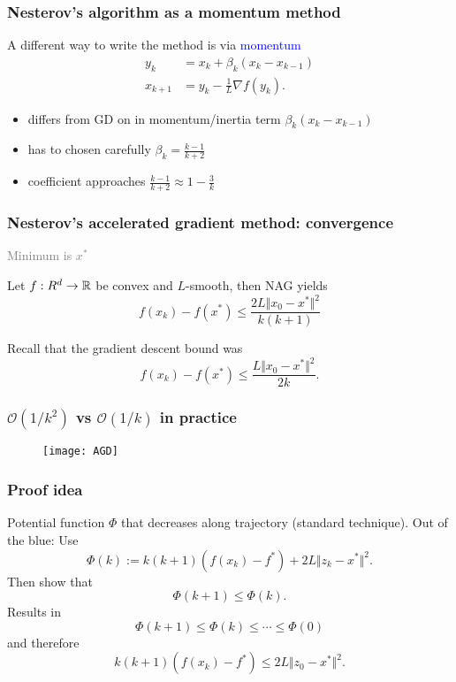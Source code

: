 \documentclass[aspectratio=149]{beamer}
\begin{document}
\begin{frame}
  \frametitle{Nesterov's algorithm as a momentum method}
  A different way to write the method is via \textcolor{blue}{momentum}
  \begin{align}
    y_{k} &= x_k + \beta_k (x_k - x_{k-1}) \\
    x_{k+1} &= y_k - \frac{1}{L} \nabla f(y_k).
  \end{align}

  \begin{itemize}
    \item differs from GD on in momentum/inertia term $\beta_k (x_k - x_{k-1})$
    \item has to chosen carefully $\beta_k = \frac{k-1}{k+2}$
    \item coefficient approaches $\frac{k-1}{k+2} \approx 1 - \frac{3}{k}$
  \end{itemize}
\end{frame}


\begin{frame}
  \frametitle{Nesterov's accelerated gradient method: convergence}
  \textcolor{grey}{Minimum is $x^*$ }
  \begin{theorem}
    Let $f: R^d \to \mathbb{R}$ be convex and $L$-smooth, then NAG yields
    \begin{equation}
      f(x_k) - f(x^*) \le \frac{2L \Vert x_0-x^* \Vert^2}{k(k+1)}
    \end{equation}
  \end{theorem}

  Recall that the gradient descent bound was
  \begin{equation}
      f(x_k) - f(x^*) \le \frac{L \Vert x_0-x^* \Vert^2}{2k}.
  \end{equation}
\end{frame}


\begin{frame}
  \frametitle{$\mathcal{O}(1/k^2)$ vs $\mathcal{O}(1/k)$ in practice}

  \begin{figure}[ht]
    \centering
    \texttt{[image: AGD]}
  \end{figure}


\end{frame}

\begin{frame}
  \frametitle{Proof idea}
  Potential function $\Phi$ that decreases along trajectory (standard technique).
  Out of the blue: Use
  \begin{equation}
    \Phi(k) := k(k+1) (f(x_k) - f^*) + 2L \Vert z_k - x^* \Vert^2.
  \end{equation}
  Then show that
  \begin{equation}
    \Phi(k+1) \le \Phi(k).
  \end{equation}
  Results in
  \begin{equation}
    \Phi(k+1) \le \Phi(k) \le \cdots \le \Phi(0)
  \end{equation}
  and therefore
  \begin{equation}
    k(k+1) (f(x_k) - f^*)  \le 2L \Vert z_0 - x^* \Vert^2.
  \end{equation}
\end{frame}
\end{document}
